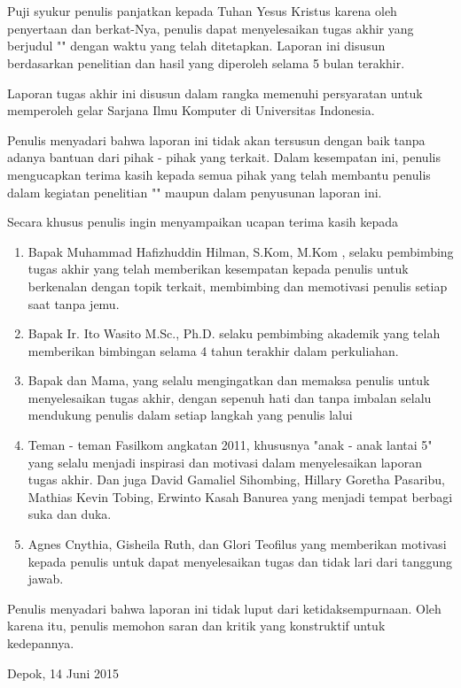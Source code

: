 \chapter*{\kataPengantar}
Puji syukur penulis panjatkan kepada Tuhan Yesus Kristus karena oleh penyertaan dan berkat-Nya, penulis dapat menyelesaikan tugas akhir yang berjudul "\judul" dengan waktu yang telah ditetapkan. Laporan ini disusun berdasarkan penelitian dan hasil yang diperoleh selama 5 bulan terakhir.

Laporan tugas akhir ini disusun dalam rangka memenuhi persyaratan untuk memperoleh gelar Sarjana Ilmu Komputer di Universitas Indonesia.

Penulis menyadari bahwa laporan ini tidak akan tersusun dengan baik tanpa adanya bantuan dari pihak - pihak yang terkait. Dalam kesempatan ini, penulis mengucapkan terima kasih kepada semua pihak yang telah membantu penulis dalam kegiatan penelitian "\judul" maupun dalam penyusunan laporan ini.

Secara khusus penulis ingin menyampaikan ucapan terima kasih kepada
\begin{enumerate}
	\item Bapak Muhammad Hafizhuddin Hilman, S.Kom, M.Kom , selaku pembimbing tugas akhir yang telah memberikan kesempatan kepada penulis untuk berkenalan dengan topik terkait, membimbing dan memotivasi penulis setiap saat tanpa jemu.
	\item Bapak Ir. Ito Wasito M.Sc., Ph.D. selaku pembimbing akademik yang telah memberikan bimbingan selama 4 tahun terakhir dalam perkuliahan. 
	\item Bapak dan Mama, yang selalu mengingatkan dan memaksa penulis untuk menyelesaikan tugas akhir, dengan sepenuh hati dan tanpa imbalan selalu mendukung penulis dalam setiap langkah yang penulis lalui  
	\item Teman - teman Fasilkom angkatan 2011, khususnya "anak - anak lantai 5" yang selalu menjadi inspirasi dan motivasi dalam menyelesaikan laporan tugas akhir. Dan juga David Gamaliel Sihombing, Hillary Goretha Pasaribu, Mathias Kevin Tobing, Erwinto Kasah Banurea yang menjadi tempat berbagi suka dan duka.
	\item Agnes Cnythia, Gisheila Ruth, dan Glori Teofilus yang memberikan motivasi kepada penulis untuk dapat menyelesaikan tugas dan tidak lari dari tanggung jawab.
\end{enumerate}

Penulis menyadari bahwa laporan ini tidak luput dari ketidaksempurnaan. Oleh karena itu, penulis memohon saran dan kritik yang konstruktif untuk kedepannya.

\vspace*{0.1cm}
\begin{flushright}
Depok, 14 Juni 2015\\[0.1cm]
\vspace*{1cm}
\penulis

\end{flushright}